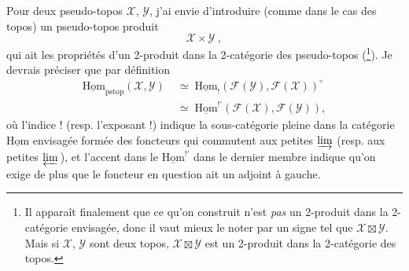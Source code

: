 \documentclass[11pt]{article}
\newcommand{\msp}[1]{\marginpar{\footnotesize [#1]}}
\newcommand{\uHom}{\underline{\mathrm{Hom}}}
\newcommand{\pstop}{\mathrm{pstop}}
\begin{document}
Pour deux pseudo-topos $\mathcal{X}$, $\mathcal{Y}$, j'ai envie d'introduire (comme dans le cas des topos) un pseudo-topos produit
\[
\mathcal{X}\times\mathcal{Y}\;,
\tag*{(4.1.4)}
\]
qui ait les propriétés d'un 2-produit dans la 2-catégorie des pseudo-topos (\footnote{Il apparaît finalement que ce qu'on construit n'est \textit{pas} un 2-produit dans la 2-catégorie envisagée, donc il vaut mieux le noter par un signe tel que $\mathcal{X}\boxtimes\mathcal{Y}$. Mais si $\mathcal{X}$, $\mathcal{Y}$ sont deux topos, $\mathcal{X}\boxtimes\mathcal{Y}$ est un 2-produit dans la 2-catégorie des topos.}). Je devrais préciser que par définition
\[
\begin{aligned}
\uHom_{\pstop}(\mathcal{X},\mathcal{Y}) \;&\simeq\; \uHom_!(\mathcal{F}(\mathcal{Y}),\mathcal{F}(\mathcal{X}))^\circ\\
&\simeq\; \uHom^{!'}(\mathcal{F}(\mathcal{X}),\mathcal{F}(\mathcal{Y})),
\end{aligned}
\tag*{(4.1.5)}
\]
où l'indice ! (resp. l'exposant !) indique la sous-catégorie pleine dans la catégorie $\uHom$ envisagée formée des foncteurs qui commutent aux petites $\varinjlim$ (resp. aux petites
\msp{page 54}
$\varprojlim$\,), et l'accent dans le $\uHom^{!'}$ dans le dernier membre indique qu'on exige de plus que le foncteur en question ait un adjoint à gauche.
\end{document}
